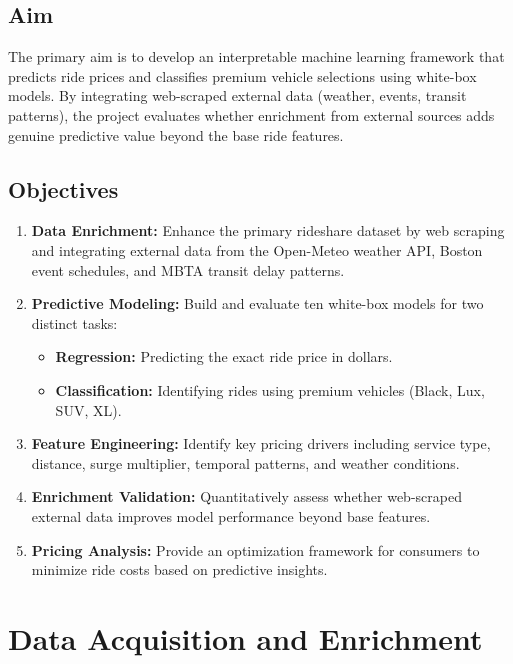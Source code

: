 \documentclass[12pt,a4paper]{article}
\begin{document}
\subsection{Aim}
The primary aim is to develop an interpretable machine learning framework that predicts ride prices and classifies premium vehicle selections using white-box models. By integrating web-scraped external data (weather, events, transit patterns), the project evaluates whether enrichment from external sources adds genuine predictive value beyond the base ride features.

\subsection{Objectives}
\begin{enumerate}
    \item \textbf{Data Enrichment:} Enhance the primary rideshare dataset by web scraping and integrating external data from the Open-Meteo weather API, Boston event schedules, and MBTA transit delay patterns.
    \item \textbf{Predictive Modeling:} Build and evaluate ten white-box models for two distinct tasks:
    \begin{itemize}
        \item \textbf{Regression:} Predicting the exact ride price in dollars.
        \item \textbf{Classification:} Identifying rides using premium vehicles (Black, Lux, SUV, XL).
    \end{itemize}
    \item \textbf{Feature Engineering:} Identify key pricing drivers including service type, distance, surge multiplier, temporal patterns, and weather conditions.
    \item \textbf{Enrichment Validation:} Quantitatively assess whether web-scraped external data improves model performance beyond base features.
    \item \textbf{Pricing Analysis:} Provide an optimization framework for consumers to minimize ride costs based on predictive insights.
\end{enumerate}

\newpage

\section{Data Acquisition and Enrichment}
\end{document}
